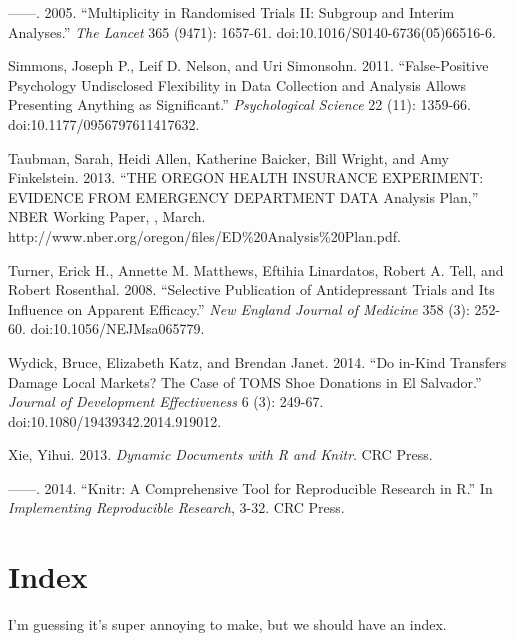 \documentclass[12pt] {article}
\begin{document}
------. 2005. ``Multiplicity in Randomised Trials II: Subgroup and
Interim Analyses.'' \emph{The Lancet} 365 (9471): 1657-61.
doi:10.1016/S0140-6736(05)66516-6.

Simmons, Joseph P., Leif D. Nelson, and Uri Simonsohn. 2011.
``False-Positive Psychology Undisclosed Flexibility in Data Collection
and Analysis Allows Presenting Anything as Significant.''
\emph{Psychological Science} 22 (11): 1359-66.
doi:10.1177/0956797611417632.

Taubman, Sarah, Heidi Allen, Katherine Baicker, Bill Wright, and Amy
Finkelstein. 2013. ``THE OREGON HEALTH INSURANCE EXPERIMENT: EVIDENCE
FROM EMERGENCY DEPARTMENT DATA Analysis Plan,'' NBER Working Paper, ,
March. http://www.nber.org/oregon/files/ED\%20Analysis\%20Plan.pdf.

Turner, Erick H., Annette M. Matthews, Eftihia Linardatos, Robert A.
Tell, and Robert Rosenthal. 2008. ``Selective Publication of
Antidepressant Trials and Its Influence on Apparent Efficacy.''
\emph{New England Journal of Medicine} 358 (3): 252-60.
doi:10.1056/NEJMsa065779.

Wydick, Bruce, Elizabeth Katz, and Brendan Janet. 2014. ``Do in-Kind
Transfers Damage Local Markets? The Case of TOMS Shoe Donations in El
Salvador.'' \emph{Journal of Development Effectiveness} 6 (3): 249-67.
doi:10.1080/19439342.2014.919012.

Xie, Yihui. 2013. \emph{Dynamic Documents with R and Knitr}. CRC Press.

------. 2014. ``Knitr: A Comprehensive Tool for Reproducible Research in
R.'' In \emph{Implementing Reproducible Research}, 3-32. CRC Press.

\section{Index}\label{index}

I'm guessing it's super annoying to make, but we should have an index.
\end{document}

